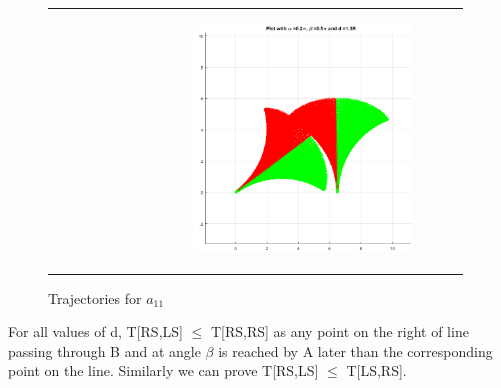 \documentclass[11pt]{article} %
\begin{document}
\begin{figure}[H]
\begin{tabular}{cc}
\begin{subfigure}[b]{0.4\columnwidth}
        		 \label{fig:a13_3}
      		 \end{subfigure}
      		  &
      		 \begin{subfigure}[b]{0.4\columnwidth}
			\parbox[c]{1em}{\includegraphics[width=6cm,height=6cm,keepaspectratio]{a11_5.png}}
        		 \label{fig:a13_4}
      		 \end{subfigure}
	
	\end{tabular}
	\caption{Trajectories for $a_{11}$}
\end{figure}
For all values of d, T[RS,LS] $\leq$ T[RS,RS] as any point on the right of line passing through B and at angle $\beta$ is reached by A later than the corresponding point on the line.
Similarly we can prove T[RS,LS] $\leq$ T[LS,RS]. 
\end{document}
